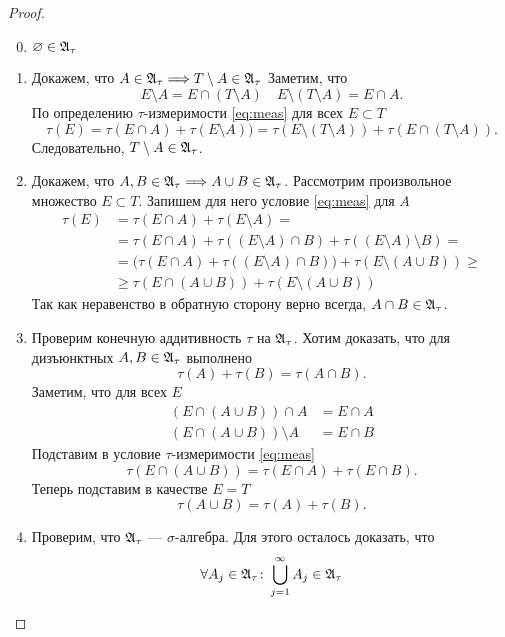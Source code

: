 \begin{proof}
	$ $
    \begin{enumerate}
		\setcounter{enumi}{-1}
		\item $ \varnothing \in  \mathfrak{A}_{\tau }$
        \item Докажем, что $ A \in \mathfrak{A}_{\tau } \Longrightarrow T\setminus A \in \mathfrak{A}_{\tau }$
			Заметим, что
			\[
				E \setminus A = E \cap (T \setminus A) \quad E \setminus (T \setminus A) = E \cap A
			.\] 
			По определению $ \tau $-измеримости \ref{eq:meas} для всех $ E \subset T$
			\[
				\tau (E) = \tau (E \cap A) + \tau (E \setminus A)) = \tau (E \setminus (T\setminus A)) + \tau (E \cap (T \setminus A))
			.\] 
			Следовательно, $ T \setminus A \in \mathfrak{A}_{\tau }$.
		\item Докажем, что $ A, B \in \mathfrak{A}_{\tau } \Longrightarrow A \cup B \in \mathfrak{A}_{\tau }$.
			Рассмотрим произвольное множество $ E \subset T$. Запишем для него условие \ref{eq:meas} для $ A$
			\[
			\begin{aligned}
				\tau (E) &= \tau (E \cap A) + \tau (E \setminus A) = \\
						 &= \tau (E \cap A) + \tau ((E\setminus A) \cap B) + \tau ((E\setminus A)\setminus B) = \\
						 &= \bigl(\tau (E \cap A) + \tau ((E\setminus A)\cap B)\bigr) + \tau (E \setminus (A\cup B)) \ge \\
						 & \ge \tau (E \cap (A\cup B)) + \tau (E \setminus (A\cup B))
			\end{aligned}
			\]
			Так как неравенство в обратную сторону верно всегда, $ A\cap B \in \mathfrak{A}_{\tau }$. 
		\item Проверим конечную аддитивность $ \tau $ на $ \mathfrak{A}_{\tau }$. Хотим доказать, что для дизъюнктных $ A, B \in \mathfrak{A}_{\tau }$ выполнено
			\[
				\tau (A) + \tau (B) = \tau (A \cap B)
			.\] 
			Заметим, что для всех $ E$
			\[
			\begin{aligned}
				(E \cap (A \cup B)) \cap A &= E \cap A \\
				(E \cap (A \cup B)) \setminus A &= E\cap B
			\end{aligned}
			\]
			Подставим в условие $ \tau $-измеримости \ref{eq:meas}
			\[
				\tau (E \cap (A \cup B)) = \tau (E \cap A) + \tau (E \cap B)
			.\] 
			Теперь подставим в качестве $ E = T$ 
			\[
				\tau (A \cup B) = \tau (A) + \tau (B)
			.\] 
		\item Проверим, что $ \mathfrak{A}_{\tau }$ --- $ \sigma $-алгебра. Для этого осталось доказать, что 
			\[
			\forall A_j \in \mathfrak{A}_{\tau } \colon \bigcup_{j=1}^{\infty} A_j \in \mathfrak{A}_{\tau }
\]
\end{enumerate}
\end{proof}
